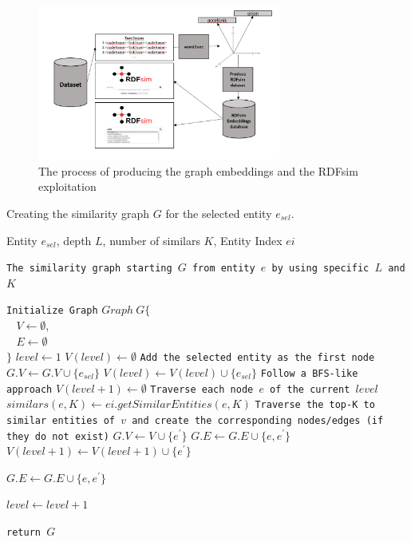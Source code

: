 \documentclass[sigconf, nonacm]{acmart}
\begin{document}
\begin{figure}[htp]
    \centering
    \includegraphics[width=8cm]{figures/embeddingsProcess.png}
    \caption{The process of producing the graph embeddings and the RDFsim exploitation}
    \label{fig:embedding-creation}
\end{figure}

\begin{algorithm}
\caption{Creating the similarity graph $G$ for the selected entity $e_{sel}$.}
\label{alg:graph}
\begin{algorithmic}

\Require Entity $e_{sel}$, depth $L$, number of similars $K$, Entity Index $ei$

\State \texttt{The similarity graph starting $G$  from entity $e$ by using specific $L$ and $K$}

\State \texttt{Initialize Graph}
\State $Graph~G \{$ \\$~~~~V \leftarrow \emptyset$, \\$~~~~E\leftarrow \emptyset$ \\
$\}$ 
\State $level \leftarrow 1$ 
\State $V(level) \leftarrow \emptyset$
\State \texttt{Add the selected entity as the first node}
\State $G.V \leftarrow G.V \cup \{e_{sel}\}$ 
\State $V(level) \leftarrow V(level) \cup \{e_{sel}\}$ 
\State \texttt{Follow a BFS-like approach}
    $V(level+1) \leftarrow \emptyset$
	\State \texttt{Traverse each node $e$ of the current $level$}
	\State $similars(e,K) \leftarrow ei.getSimilarEntities(e,K)$
	\State \texttt{Traverse  the top-K to similar entities of $v$ and create the corresponding nodes/edges (if they do not exist)}
	            \State $G.V \leftarrow V \cup  \{e^{\prime}\}$ 
	            \State $G.E \leftarrow G.E \cup \{e,e^{\prime}\}$ 
	            \State $V(level+1) \leftarrow V(level+1) \cup { \{e^{\prime}\}}$
	              
	            \State $G.E \leftarrow G.E \cup \{e,e^{\prime}\}$
            \EndIf
	    \EndFor
    \EndFor
\EndWhile
	    
\State $level \leftarrow level+1$
	   
\State \texttt{return $G$} 
	
\end{algorithmic}
\end{algorithm}
\end{document}
